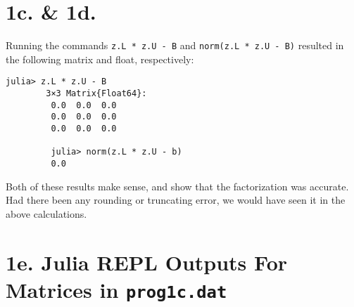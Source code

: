\documentclass{article}
\begin{document}
    \section*{1c. \& 1d.}
    Running the commands \texttt{z.L * z.U - B} and \texttt{norm(z.L * z.U - B)} resulted in the following matrix and float, respectively:
    \begin{Verbatim}[xleftmargin=4cm]
        julia> z.L * z.U - B
        3×3 Matrix{Float64}:
         0.0  0.0  0.0
         0.0  0.0  0.0
         0.0  0.0  0.0

         julia> norm(z.L * z.U - b)
         0.0
    \end{Verbatim}
    Both of these results make sense, and show that the factorization was accurate. Had there been any rounding or truncating error, we would 
    have seen it in the above calculations.



    \section*{1e. Julia REPL Outputs For Matrices in \texttt{prog1c.dat}}
\end{document}

